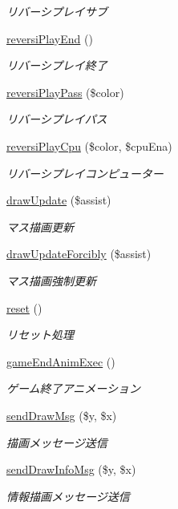 \begin{DoxyCompactItemize}
\begin{DoxyCompactList}\small\item\em リバーシプレイサブ \end{DoxyCompactList}\item 
\hyperlink{class_reversi_play_af55fe6b6f2005c7da80c696ed692783d}{reversi\+Play\+End} ()
\begin{DoxyCompactList}\small\item\em リバーシプレイ終了 \end{DoxyCompactList}\item 
\hyperlink{class_reversi_play_a67816fe65a87e35d8e8cc35d5d269bcb}{reversi\+Play\+Pass} (\$color)
\begin{DoxyCompactList}\small\item\em リバーシプレイパス \end{DoxyCompactList}\item 
\hyperlink{class_reversi_play_a6514ad9244af720ee1ec1777c11e80fb}{reversi\+Play\+Cpu} (\$color, \$cpu\+Ena)
\begin{DoxyCompactList}\small\item\em リバーシプレイコンピューター \end{DoxyCompactList}\item 
\hyperlink{class_reversi_play_a52029e5f2e049767d1f67c3f5c18ce9f}{draw\+Update} (\$assist)
\begin{DoxyCompactList}\small\item\em マス描画更新 \end{DoxyCompactList}\item 
\hyperlink{class_reversi_play_a3ae28eb121caf59932218ea7d1fca81d}{draw\+Update\+Forcibly} (\$assist)
\begin{DoxyCompactList}\small\item\em マス描画強制更新 \end{DoxyCompactList}\item 
\hyperlink{class_reversi_play_a4a20559544fdf4dcb457e258dc976cf8}{reset} ()
\begin{DoxyCompactList}\small\item\em リセット処理 \end{DoxyCompactList}\item 
\hyperlink{class_reversi_play_acbcd366da8242203ae52fb685fbc929e}{game\+End\+Anim\+Exec} ()
\begin{DoxyCompactList}\small\item\em ゲーム終了アニメーション \end{DoxyCompactList}\item 
\hyperlink{class_reversi_play_af27aaf13f15a080c006432338a06c481}{send\+Draw\+Msg} (\$y, \$x)
\begin{DoxyCompactList}\small\item\em 描画メッセージ送信 \end{DoxyCompactList}\item 
\hyperlink{class_reversi_play_a829b61937e857a9f1b5b371be25dbabd}{send\+Draw\+Info\+Msg} (\$y, \$x)
\begin{DoxyCompactList}\small\item\em 情報描画メッセージ送信 \end{DoxyCompactList}\end{DoxyCompactItemize}
